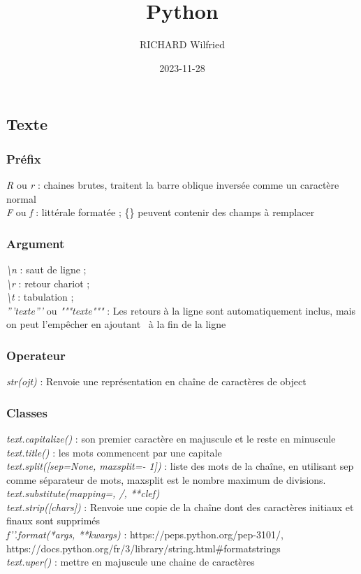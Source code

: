 \documentclass[a4paper,12pt]{report}
\author{RICHARD Wilfried}
\title{Python}
\date{2023-11-28}
\begin{document}
	\maketitle
	\tableofcontents
	\subsection{Texte}
		\subsubsection{Préfix}
			\textit{R} ou \textit{r} : chaines brutes, traitent la barre oblique inversée comme un caractère normal\\
			\textit{F} ou \textit{f} : littérale formatée ; \{\} peuvent contenir des champs à remplacer
		\subsubsection{Argument}
			\textit{\textbackslash n} : saut de ligne ;\\
			\textit{\textbackslash r} : retour chariot ;\\
			\textit{\textbackslash t} : tabulation ;\\
			\textit{'''texte'''} ou \textit{"""texte""" }: Les retours à la ligne sont automatiquement inclus, mais on peut l'empêcher en ajoutant \ à la fin de la ligne
		\subsubsection{Operateur}
			\textit{str(ojt)} : Renvoie une représentation en chaîne de caractères de object
		\subsubsection{Classes}
			\textit{text.capitalize()} : son premier caractère en majuscule et le reste en minuscule\\
			\textit{text.title()} : les mots commencent par une capitale\\
			\textit{text.split([sep=None, maxsplit=- 1])} : liste des mots de la chaîne, en utilisant sep comme séparateur de mots, maxsplit est le nombre maximum de divisions.\\
			\textit{text.substitute(mapping={}, /, **clef)}\\
			\textit{text.strip([chars])} : Renvoie une copie de la chaîne dont des caractères initiaux et finaux sont supprimés\\
			\textit{f'{}'.format(*args, **kwargs)} : 
				https://peps.python.org/pep-3101/, 
				https://docs.python.org/fr/3/library/string.html\#formatstrings\\
			\textit{text.uper()} : mettre en majuscule une chaine de caractères
\end{document}

